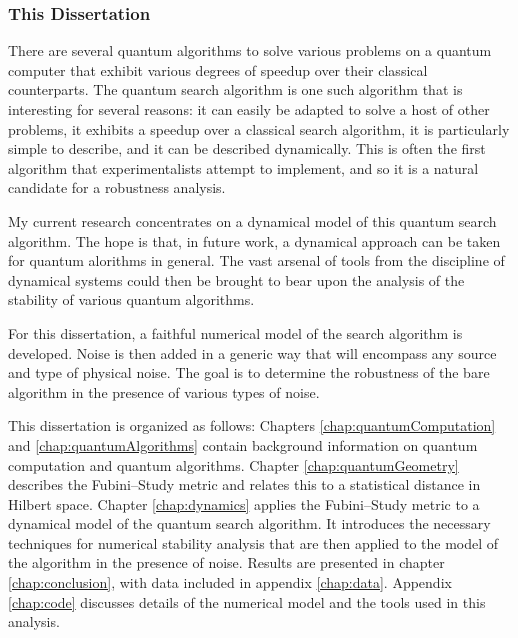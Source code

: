 \subsubsection{This Dissertation} 

There are several quantum algorithms to solve various problems
on a quantum computer that exhibit various degrees of 
speedup over their classical counterparts.  
The quantum search algorithm is one such algorithm that is
interesting for several reasons: it can easily be adapted to
solve a host of other problems, it exhibits a speedup over a
classical search algorithm, it is particularly simple to 
describe, and it can be described dynamically.
This is often the first algorithm that experimentalists attempt
to implement, and so it is a natural candidate for a 
robustness analysis.

My current research concentrates on a dynamical model of this
quantum search algorithm.  The hope is that, in future work,
a dynamical approach can be taken for quantum alorithms in 
general.  The vast arsenal of tools from the discipline of 
dynamical systems could then be brought to bear upon the 
analysis of the stability of various quantum algorithms.

For this dissertation, a faithful numerical model of the search
algorithm is developed.  Noise is then added
in a generic way that will encompass any source and type of 
physical noise.
The goal is to determine the robustness of the bare algorithm
in the presence of various types of noise.

This dissertation is organized as follows:  Chapters \ref{chap:quantumComputation}
and \ref{chap:quantumAlgorithms} contain background information on quantum computation
and quantum algorithms.
Chapter \ref{chap:quantumGeometry} describes the
Fubini--Study metric and relates this to a statistical distance in Hilbert space.
Chapter \ref{chap:dynamics} applies the Fubini--Study  metric to a dynamical 
model of the quantum search algorithm.
It introduces the
necessary techniques for numerical stability analysis that are then applied to
the model of the algorithm in the presence of noise. 
Results are presented in chapter \ref{chap:conclusion}, with
data included in appendix \ref{chap:data}.
Appendix \ref{chap:code} discusses details of the numerical model and the 
tools used in this analysis. 


